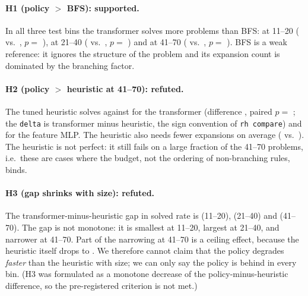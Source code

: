 \paragraph{H1 (policy $>$ BFS): supported.} In all three test bins the transformer solves more problems than BFS: at 11--20 ( vs.\ , $p=$ ), at 21--40 ( vs.\ , $p=$ ) and at 41--70 ( vs.\ , $p=$ ). BFS is a weak reference: it ignores the structure of the problem and its expansion count is dominated by the branching factor.

\paragraph{H2 (policy $>$ heuristic at 41--70): refuted.} The tuned heuristic solves  against  for the transformer (difference , paired $p=$ ; the \texttt{delta} is transformer minus heuristic, the sign convention of \texttt{rh compare}) and  for the feature MLP. The heuristic also needs fewer expansions on average ( vs.\ ). The heuristic is not perfect: it still fails on a large fraction of the 41--70 problems, i.e.\ these are cases where the budget, not the ordering of non-branching rules, binds.

\paragraph{H3 (gap shrinks with size): refuted.} The transformer-minus-heuristic gap in solved rate is  (11--20),  (21--40) and  (41--70). The gap is not monotone: it is smallest at 11--20, largest at 21--40, and narrower at 41--70. Part of the narrowing at 41--70 is a ceiling effect, because the heuristic itself drops to . We therefore cannot claim that the policy degrades \emph{faster} than the heuristic with size; we can only say the policy is behind in every bin. (H3 was formulated as a monotone decrease of the policy-minus-heuristic difference, so the pre-registered criterion is not met.)

